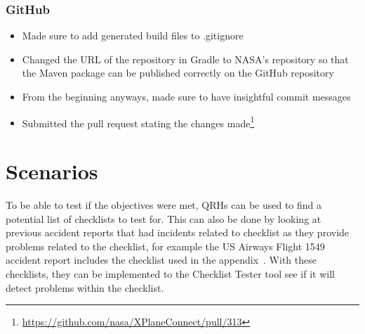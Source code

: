 \documentclass[../dissertation.tex]{subfiles}
\begin{document}
\subsubsection{GitHub}
\begin{itemize}
  \item Made sure to add generated build files to .gitignore
  \item Changed the URL of the repository in Gradle to NASA's repository so that
    the Maven package can be published correctly on the GitHub repository
  \item From the beginning anyways, made sure to have insightful commit messages
  \item Submitted the pull request stating the changes made\footnote{\url{https://github.com/nasa/XPlaneConnect/pull/313}}
\end{itemize}



\section{Scenarios}
To be able to test if the objectives were met, QRHs can be used to find a potential
list of checklists to test for.
This can also be done by looking at previous accident reports that had incidents related
to checklist as they provide problems related to the checklist,
for example the US Airways Flight 1549 accident report includes the checklist
used in the appendix~\cite{ntsb:AWE1549}.
With these checklists, they can be implemented to the Checklist Tester tool
see if it will detect problems within the checklist. 
\end{document}
